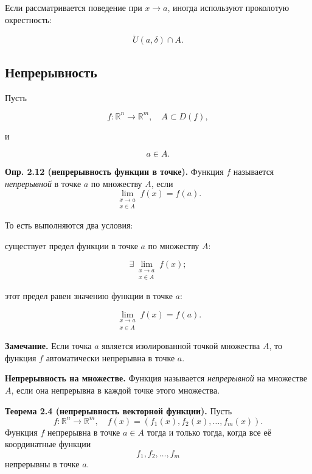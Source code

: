 \documentclass[a4paper,12pt]{article}
\begin{document}
Если рассматривается поведение при $x\to a$, иногда используют проколотую окрестность:

\[
\dot U(a,\delta)\cap A.
\]

\subsection*{Непрерывность}

Пусть

\[
f:\mathbb{R}^n\to\mathbb{R}^m,
\quad
A\subset D(f),
\]

и

\[
a\in A.
\]

\begin{definitionbox}
\textbf{Опр. 2.12 (непрерывность функции в точке).}
Функция $f$ называется \textit{непрерывной} в точке $a$ по множеству $A$, если
\[
\lim_{\substack{x\to a\\ x\in A}} f(x)=f(a).
\]
\end{definitionbox}

То есть выполняются два условия:

существует предел функции в точке $a$ по множеству $A$:

\[
\exists \lim_{\substack{x\to a\\ x\in A}} f(x);
\]

этот предел равен значению функции в точке $a$:

\[
\lim_{\substack{x\to a\\ x\in A}} f(x)=f(a).
\]

\begin{notebox}
\textbf{Замечание.}
Если точка $a$ является изолированной точкой множества $A$, то функция $f$ автоматически непрерывна в точке $a$.
\end{notebox}

\begin{definitionbox}
\textbf{Непрерывность на множестве.}
Функция называется \textit{непрерывной} на множестве $A$, если она непрерывна в каждой точке этого множества.
\end{definitionbox}

\begin{theorembox}
\textbf{Теорема 2.4 (непрерывность векторной функции).}
Пусть
\[
f:\mathbb{R}^n\to\mathbb{R}^m,
\quad
f(x)=
\left(
f_1(x),
f_2(x),
\ldots,
f_m(x)
\right).
\]
Функция $f$ непрерывна в точке $a\in A$ тогда и только тогда, когда все её координатные функции
\[
f_1,
f_2,
\ldots,
f_m
\]
непрерывны в точке $a$.
\end{theorembox}
\end{document}
